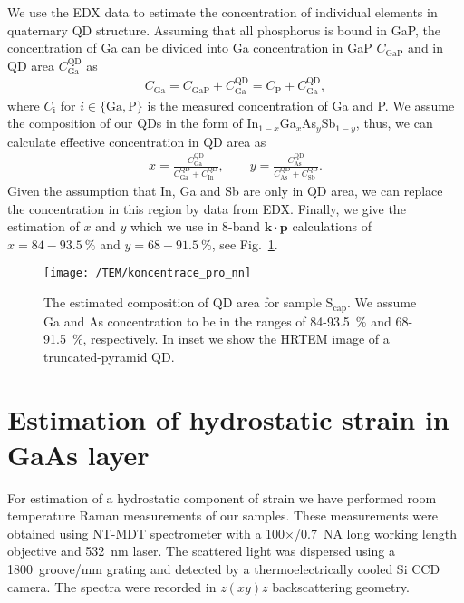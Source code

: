 We use the EDX data to estimate the concentration of individual elements in quaternary QD structure. Assuming that all phosphorus is bound in GaP, the concentration of Ga can be divided into Ga concentration in GaP $C_\mathrm{GaP}$ and in QD area $C_\mathrm{Ga}^\mathrm{QD}$ as
%
\begin{eqnarray}
C_\mathrm{Ga}=C_\mathrm{GaP}+C_\mathrm{Ga}^\mathrm{QD}=C_\mathrm{P}+C_\mathrm{Ga}^\mathrm{QD},
\end{eqnarray}
%
where $C_\mathrm{i}$ for $i \in \{\mathrm{Ga}, \mathrm{P}\}$ is the measured concentration of Ga and P. We assume the composition of our QDs in the form of In$_{1-x}$Ga$_{x}$As$_y$Sb$_{1-y}$, thus, we can calculate effective concentration in QD area as
%
\begin{eqnarray}
x=\frac{C_\mathrm{Ga}^\mathrm{QD}}{C_\mathrm{Ga}^\mathrm{QD}+C_\mathrm{In}^\mathrm{QD}},\qquad
y=\frac{C_\mathrm{As}^\mathrm{QD}}{C_\mathrm{As}^\mathrm{QD}+C_\mathrm{Sb}^\mathrm{QD}}.
\end{eqnarray}
%
Given the assumption that In, Ga and Sb are only in QD area, we can replace the concentration in this region by data from EDX. Finally, we give the estimation of $x$ and $y$ which we use in 8-band $\mathbf{k\cdot p}$ calculations of $x=84-93.5~\%$ and $y=68-91.5~\%$, see Fig.~\ref{fig:concentration_estimation}.


\begin{figure}
	\centering
	\texttt{[image: /TEM/koncentrace\_pro\_nn]} %
	\caption{The estimated composition of QD area for sample S$_\mathrm{cap}$. We assume Ga and As concentration to be in the ranges of 84-93.5~\% and 68-91.5~\%, respectively. In inset we show the HRTEM image of a truncated-pyramid QD.}
	\label{fig:concentration_estimation}
\end{figure}

\clearpage

\section{Estimation of hydrostatic strain in GaAs layer}
For estimation of a hydrostatic component of strain we have performed room temperature Raman measurements of our samples. These measurements were obtained using NT-MDT spectrometer with a 100$\times$/0.7~NA long working length objective and 532~nm laser. The scattered light was dispersed using a 1800~groove/mm grating and detected by a thermoelectrically cooled Si CCD camera. The spectra were recorded in $z(xy)z$ backscattering geometry.


